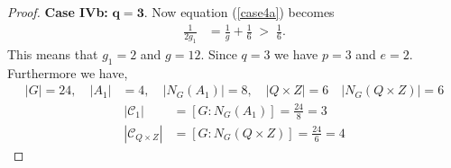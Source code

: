 \begin{proof}
 \space \textbf{Case IVb:} $\pmb{q = 3}$. Now equation (\ref{case4a}) becomes
\begin{align*} \frac{1}{2g_1} &= \frac{1}{g} + \frac{1}{6} \; > \; \frac{1}{6}.
\end{align*}
This means that $g_1 = 2$ and $g = 12$. Since $q=3$ we have $p=3$ and $e=2$. Furthermore we have,
\begin{align*} |G| = 24, \quad |A_1| &= 4,  \quad |N_G(A_1)| = 8, \quad |Q \times Z| = 6 \quad |N_G(Q \times Z)| = 6
\end{align*}
\begin{align*} |\mathcal{C}_1| &= [G : N_G(A_1)] = \frac{24}{8} = 3
\\ |\mathcal{C}_{Q \times Z}| &= [G : N_G(Q \times Z)] = \frac{24}{6} = 4
\end{align*}









\end{proof}
